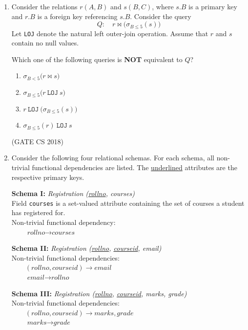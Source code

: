 \documentclass[12pt]{article}
\begin{document}
\begin{enumerate}
(GATE CS 2018)

\item Consider the relations $r(A,B)$ and $s(B,C)$, where $s.B$ is a primary key and $r.B$ is a foreign
key referencing $s.B$. Consider the query
$$
Q:\quad r \Join \bigl(\sigma_{B \le 5}(s)\bigr)
$$
Let \texttt{LOJ} denote the natural left outer-join operation. Assume that $r$ and $s$ contain no null
values.

Which one of the following queries is \textbf{NOT} equivalent to $Q$?

\begin{multicols}{2}
\begin{enumerate}
\item $\sigma_{B<5}\bigl(r \Join s\bigr)$
\item $\sigma_{B \le 5}\bigl(r \ \texttt{LOJ}\ s\bigr)$
\item $r \ \texttt{LOJ}\ \bigl(\sigma_{B \le 5}(s)\bigr)$
\item $\sigma_{B \le 5}(r)\ \texttt{LOJ}\ s$
\end{enumerate}
\end{multicols}

(GATE CS 2018)

\item Consider the following four relational schemas. For each schema, all non-trivial functional
dependencies are listed. The \underline{underlined} attributes are the respective primary keys.

\textbf{Schema I:} \emph{Registration (\underline{rollno}, courses)}\\
Field \texttt{courses} is a set-valued attribute containing the set of courses a student has
registered for.\\
Non-trivial functional dependency: \\
$\qquad \textit{rollno} \rightarrow \textit{courses}$

\textbf{Schema II:} \emph{Registration (\underline{rollno}, \underline{courseid}, email)}\\
Non-trivial functional dependencies: \\
$\qquad (\textit{rollno}, \textit{courseid}) \rightarrow \textit{email}$\\
$\qquad \textit{email} \rightarrow \textit{rollno}$

\textbf{Schema III:} \emph{Registration (\underline{rollno}, \underline{courseid}, marks, grade)}\\
Non-trivial functional dependencies: \\
$\qquad (\textit{rollno}, \textit{courseid}) \rightarrow \textit{marks}, \textit{grade}$\\
$\qquad \textit{marks} \rightarrow \textit{grade}$


\end{enumerate}
\end{document}
